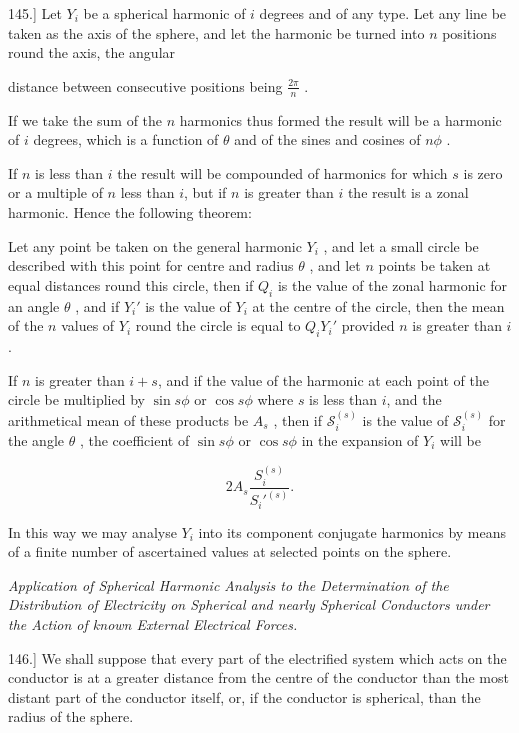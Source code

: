 \documentclass[11pt,a4paper]{article}
\begin{document}
145.] Let  $Y_i$  be a spherical harmonic of $i$ degrees and of any type. Let any line be taken as the axis of the sphere, and let the harmonic be turned into $n$ positions round the axis, the angular

distance between consecutive positions being  $\frac{2\pi}{n}$ .

If we take the sum of the $n$ harmonics thus formed the result will be a harmonic of $i$ degrees, which is a function of  $\theta$  and of the sines and cosines of  $n\phi$ .

If $n$ is less than $i$ the result will be compounded of harmonics for which $s$ is zero or a multiple of $n$ less than $i$, but if $n$ is greater than $i$ the result is a zonal harmonic. Hence the following theorem:

Let any point be taken on the general harmonic  $Y_i$ , and let a small circle be described with this point for centre and radius  $\theta$ , and let $n$ points be taken at equal distances round this circle, then if  $Q_i$  is the value of the zonal harmonic for an angle  $\theta$ , and if  $Y_i'$  is the value of  $Y_i$  at the centre of the circle, then the mean of the $n$ values of  $Y_i$  round the circle is equal to  $Q_iY_i'$  provided $n$ is greater than $i$.

If $n$ is greater than $i+s$, and if the value of the harmonic at each point of the circle be multiplied by  $\sin s\phi$  or  $\cos s\phi$  where $s$ is less than $i$, and the arithmetical mean of these products be  $A_s$ , then if  $\mathcal{S}_i^{(s)}$  is the value of  $\mathcal{S}_i^{(s)}$  for the angle  $\theta$ , the coefficient of  $\sin s\phi$  or  $\cos s\phi$  in the expansion of  $Y_i$  will be

\[
2A_s\frac{S_i^{(s)}}{S_i'^{(s)}}.
\]

In this way we may analyse  $Y_i$  into its component conjugate harmonics by means of a finite number of ascertained values at selected points on the sphere.

{\centering\itshape Application of Spherical Harmonic Analysis to the Determination of the Distribution of Electricity on Spherical and nearly Spherical Conductors under the Action of known External Electrical Forces.\par}

146.] We shall suppose that every part of the electrified system which acts on the conductor is at a greater distance from the centre of the conductor than the most distant part of the conductor itself, or, if the conductor is spherical, than the radius of the sphere.
\end{document}
